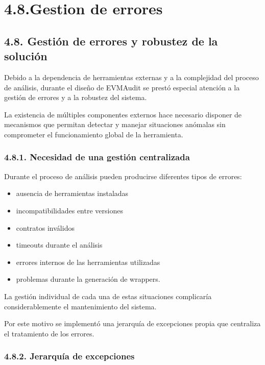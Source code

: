 \section{4.8.Gestion de errores}\label{gestion-de-errores}

\subsection{4.8. Gestión de errores y robustez de la
solución}\label{gestiuxf3n-de-errores-y-robustez-de-la-soluciuxf3n}

Debido a la dependencia de herramientas externas y a la complejidad del
proceso de análisis, durante el diseño de EVMAudit se prestó especial
atención a la gestión de errores y a la robustez del sistema.

La existencia de múltiples componentes externos hace necesario disponer
de mecanismos que permitan detectar y manejar situaciones anómalas sin
comprometer el funcionamiento global de la herramienta.

\subsubsection{4.8.1. Necesidad de una gestión
centralizada}\label{necesidad-de-una-gestiuxf3n-centralizada}

Durante el proceso de análisis pueden producirse diferentes tipos de
errores:

\begin{itemize}
\tightlist
\item
  ausencia de herramientas instaladas
\item
  incompatibilidades entre versiones
\item
  contratos inválidos
\item
  timeouts durante el análisis
\item
  errores internos de las herramientas utilizadas
\item
  problemas durante la generación de wrappers.
\end{itemize}

La gestión individual de cada una de estas situaciones complicaría
considerablemente el mantenimiento del sistema.

Por este motivo se implementó una jerarquía de excepciones propia que
centraliza el tratamiento de los errores.

\subsubsection{4.8.2. Jerarquía de
excepciones}\label{jerarquuxeda-de-excepciones}

